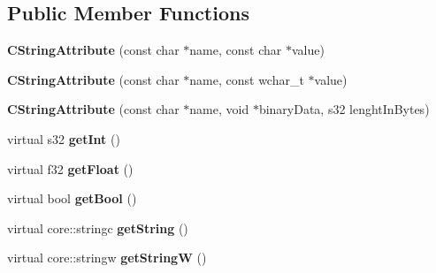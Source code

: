 \subsection*{Public Member Functions}
\begin{DoxyCompactItemize}
\item 
\hypertarget{classirr_1_1io_1_1_c_string_attribute_a2e21f8e35d6fef997b3ec96b438a4d34}{{\bfseries C\-String\-Attribute} (const char $\ast$name, const char $\ast$value)}\label{classirr_1_1io_1_1_c_string_attribute_a2e21f8e35d6fef997b3ec96b438a4d34}

\item 
\hypertarget{classirr_1_1io_1_1_c_string_attribute_a1cf8f14613d3a332852fb00e485c3a39}{{\bfseries C\-String\-Attribute} (const char $\ast$name, const wchar\-\_\-t $\ast$value)}\label{classirr_1_1io_1_1_c_string_attribute_a1cf8f14613d3a332852fb00e485c3a39}

\item 
\hypertarget{classirr_1_1io_1_1_c_string_attribute_ae323d3f3cbf058affd0eb36bdc813afd}{{\bfseries C\-String\-Attribute} (const char $\ast$name, void $\ast$binary\-Data, s32 lenght\-In\-Bytes)}\label{classirr_1_1io_1_1_c_string_attribute_ae323d3f3cbf058affd0eb36bdc813afd}

\item 
\hypertarget{classirr_1_1io_1_1_c_string_attribute_afcef1a36a3cef3bfc3716c30f1d0b65a}{virtual s32 {\bfseries get\-Int} ()}\label{classirr_1_1io_1_1_c_string_attribute_afcef1a36a3cef3bfc3716c30f1d0b65a}

\item 
\hypertarget{classirr_1_1io_1_1_c_string_attribute_aaaac1cfd5eacc98206067782ad8d131d}{virtual f32 {\bfseries get\-Float} ()}\label{classirr_1_1io_1_1_c_string_attribute_aaaac1cfd5eacc98206067782ad8d131d}

\item 
\hypertarget{classirr_1_1io_1_1_c_string_attribute_a3739d95bdd3a18b0ba0dcf5c083caae0}{virtual bool {\bfseries get\-Bool} ()}\label{classirr_1_1io_1_1_c_string_attribute_a3739d95bdd3a18b0ba0dcf5c083caae0}

\item 
\hypertarget{classirr_1_1io_1_1_c_string_attribute_a39bb49f3edc78e531071f7fd099ac634}{virtual core\-::stringc {\bfseries get\-String} ()}\label{classirr_1_1io_1_1_c_string_attribute_a39bb49f3edc78e531071f7fd099ac634}

\item 
\hypertarget{classirr_1_1io_1_1_c_string_attribute_a81c53c124f936fc90d03294a4d568cc0}{virtual core\-::stringw {\bfseries get\-String\-W} ()}\label{classirr_1_1io_1_1_c_string_attribute_a81c53c124f936fc90d03294a4d568cc0}


\end{DoxyCompactItemize}
